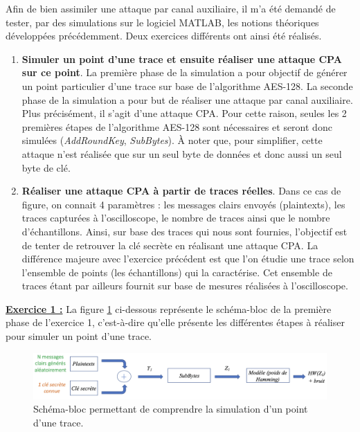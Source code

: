 \documentclass[10pt, oneside, a4paper]{article}
\begin{document}
Afin de bien assimiler une attaque par canal auxiliaire, il m'a été demandé de tester, par des simulations sur le logiciel MATLAB, les notions théoriques développées précédemment. Deux exercices différents ont ainsi été réalisés. 
\begin{enumerate}
\item \textbf{Simuler un point d'une trace et ensuite réaliser une attaque CPA sur ce point}. La première phase de la simulation a pour objectif de générer un point particulier d'une trace sur base de l'algorithme AES-128. La seconde phase de la simulation a pour but de réaliser une attaque par canal auxiliaire. Plus précisément, il s'agit d'une attaque CPA. Pour cette raison, seules les 2 premières étapes de l'algorithme AES-128 sont nécessaires et seront donc simulées (\textit{AddRoundKey}, \textit{SubBytes}). À noter que, pour simplifier, cette attaque n'est réalisée que sur un seul byte de données et donc aussi un seul byte de clé.
\item \textbf{Réaliser une attaque CPA à partir de traces réelles}. Dans ce cas de figure, on connait 4 paramètres : les messages clairs envoyés (plaintexts), les traces capturées à l'oscilloscope, le nombre de traces ainsi que le nombre d'échantillons. Ainsi, sur base des traces qui nous sont fournies, l'objectif est de tenter de retrouver la clé secrète en réalisant une attaque CPA. La différence majeure avec l'exercice précédent est que l'on étudie une trace selon l'ensemble de points (les échantillons) qui la caractérise. Cet ensemble de traces étant par ailleurs fournit sur base de mesures réalisées à l'oscilloscope. \\
\end{enumerate}

\hspace{-0.5 cm}\textbf{\underline{Exercice 1 :}} La figure \ref{fig:simul1} ci-dessous représente le schéma-bloc de la première phase de l'exercice 1, c'est-à-dire qu'elle présente les différentes étapes à réaliser pour simuler un point d'une trace.
\begin{figure}[htbp]
    \centering
    \includegraphics[scale=0.45]{image/simul1}
    \caption{Schéma-bloc permettant de comprendre la simulation d'un point d'une trace.}
    \label{fig:simul1} 
\end{figure}
\end{document}
